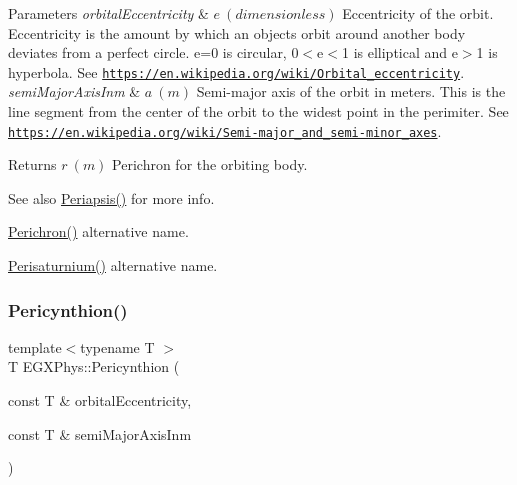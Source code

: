 \begin{DoxyParams}{Parameters}
{\em orbital\+Eccentricity} & $ e\ (dimensionless)$ Eccentricity of the orbit. Eccentricity is the amount by which an objects orbit around another body deviates from a perfect circle. e=0 is circular, 0$<$e$<$1 is elliptical and e$>$1 is hyperbola. See \href{https://en.wikipedia.org/wiki/Orbital_eccentricity}{\tt https\+://en.\+wikipedia.\+org/wiki/\+Orbital\+\_\+eccentricity}. \\
\hline
{\em semi\+Major\+Axis\+Inm} & $ a\ (m)$ Semi-\/major axis of the orbit in meters. This is the line segment from the center of the orbit to the widest point in the perimiter. See \href{https://en.wikipedia.org/wiki/Semi-major_and_semi-minor_axes}{\tt https\+://en.\+wikipedia.\+org/wiki/\+Semi-\/major\+\_\+and\+\_\+semi-\/minor\+\_\+axes}. \\
\hline
\end{DoxyParams}
\begin{DoxyReturn}{Returns}
$ r\ (m)$ Perichron for the orbiting body. 
\end{DoxyReturn}
\begin{DoxySeeAlso}{See also}
\mbox{\hyperlink{group___e_g_x_phys-_periapsis_gad487212733711bc2ce73c8137c9309c3}{Periapsis()}} for more info. 

\mbox{\hyperlink{group___e_g_x_phys-_periapsis_gae8dfb0b7ebcd117ba94f2d1a7b2e13ad}{Perichron()}} alternative name. 

\mbox{\hyperlink{group___e_g_x_phys-_periapsis_ga9e41853412b564c33a192f7335e4f6fe}{Perisaturnium()}} alternative name. 
\end{DoxySeeAlso}
\mbox{\label{group___e_g_x_phys-_periapsis_ga101f47cc9ce1eb98aeec35fa5c9ba9e4}} 
\subsubsection{\texorpdfstring{Pericynthion()}{Pericynthion()}}
{\footnotesize\ttfamily template$<$typename T $>$ \\
T E\+G\+X\+Phys\+::\+Pericynthion (\begin{DoxyParamCaption}\item[{const T \&}]{orbital\+Eccentricity,  }\item[{const T \&}]{semi\+Major\+Axis\+Inm }\end{DoxyParamCaption})}



